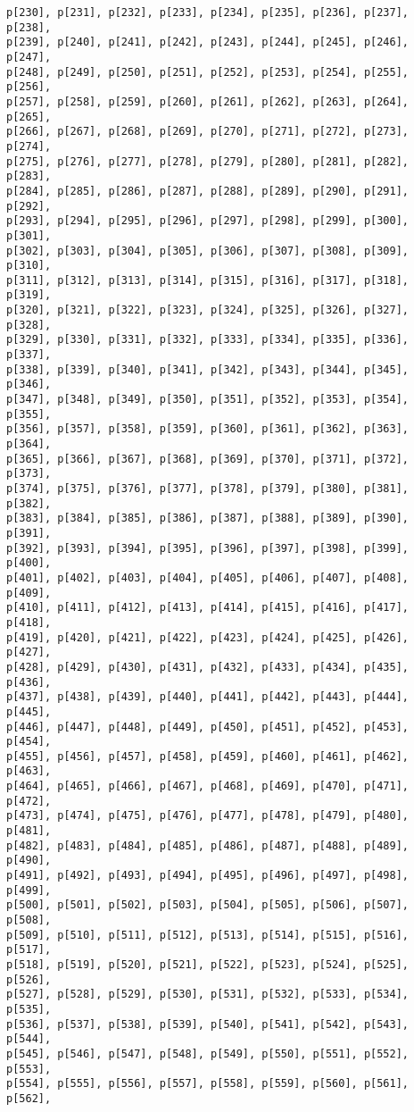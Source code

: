 \documentclass[
  letterpaper,
  DIV=11,
  numbers=noendperiod]{scrartcl}
\begin{document}
\begin{verbatim}
p[230], p[231], p[232], p[233], p[234], p[235], p[236], p[237], p[238],
p[239], p[240], p[241], p[242], p[243], p[244], p[245], p[246], p[247],
p[248], p[249], p[250], p[251], p[252], p[253], p[254], p[255], p[256],
p[257], p[258], p[259], p[260], p[261], p[262], p[263], p[264], p[265],
p[266], p[267], p[268], p[269], p[270], p[271], p[272], p[273], p[274],
p[275], p[276], p[277], p[278], p[279], p[280], p[281], p[282], p[283],
p[284], p[285], p[286], p[287], p[288], p[289], p[290], p[291], p[292],
p[293], p[294], p[295], p[296], p[297], p[298], p[299], p[300], p[301],
p[302], p[303], p[304], p[305], p[306], p[307], p[308], p[309], p[310],
p[311], p[312], p[313], p[314], p[315], p[316], p[317], p[318], p[319],
p[320], p[321], p[322], p[323], p[324], p[325], p[326], p[327], p[328],
p[329], p[330], p[331], p[332], p[333], p[334], p[335], p[336], p[337],
p[338], p[339], p[340], p[341], p[342], p[343], p[344], p[345], p[346],
p[347], p[348], p[349], p[350], p[351], p[352], p[353], p[354], p[355],
p[356], p[357], p[358], p[359], p[360], p[361], p[362], p[363], p[364],
p[365], p[366], p[367], p[368], p[369], p[370], p[371], p[372], p[373],
p[374], p[375], p[376], p[377], p[378], p[379], p[380], p[381], p[382],
p[383], p[384], p[385], p[386], p[387], p[388], p[389], p[390], p[391],
p[392], p[393], p[394], p[395], p[396], p[397], p[398], p[399], p[400],
p[401], p[402], p[403], p[404], p[405], p[406], p[407], p[408], p[409],
p[410], p[411], p[412], p[413], p[414], p[415], p[416], p[417], p[418],
p[419], p[420], p[421], p[422], p[423], p[424], p[425], p[426], p[427],
p[428], p[429], p[430], p[431], p[432], p[433], p[434], p[435], p[436],
p[437], p[438], p[439], p[440], p[441], p[442], p[443], p[444], p[445],
p[446], p[447], p[448], p[449], p[450], p[451], p[452], p[453], p[454],
p[455], p[456], p[457], p[458], p[459], p[460], p[461], p[462], p[463],
p[464], p[465], p[466], p[467], p[468], p[469], p[470], p[471], p[472],
p[473], p[474], p[475], p[476], p[477], p[478], p[479], p[480], p[481],
p[482], p[483], p[484], p[485], p[486], p[487], p[488], p[489], p[490],
p[491], p[492], p[493], p[494], p[495], p[496], p[497], p[498], p[499],
p[500], p[501], p[502], p[503], p[504], p[505], p[506], p[507], p[508],
p[509], p[510], p[511], p[512], p[513], p[514], p[515], p[516], p[517],
p[518], p[519], p[520], p[521], p[522], p[523], p[524], p[525], p[526],
p[527], p[528], p[529], p[530], p[531], p[532], p[533], p[534], p[535],
p[536], p[537], p[538], p[539], p[540], p[541], p[542], p[543], p[544],
p[545], p[546], p[547], p[548], p[549], p[550], p[551], p[552], p[553],
p[554], p[555], p[556], p[557], p[558], p[559], p[560], p[561], p[562],

\end{verbatim}
\end{document}
